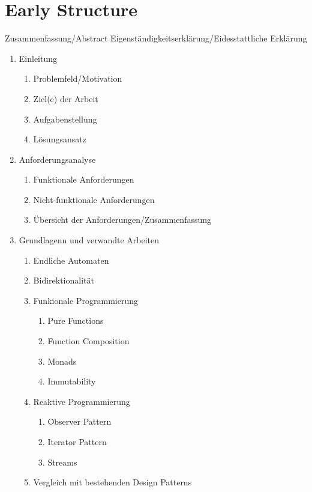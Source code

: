 \section{Early Structure}
\label{sec:early-structure}

\quad Zusammenfassung/Abstract \linebreak
\quad Eigenständigkeitserklärung/Eidesstattliche Erklärung
\begin{enumerate}
    \item Einleitung
    \begin{enumerate}
        \item Problemfeld/Motivation
        \item Ziel(e) der Arbeit
        \item Aufgabenstellung
        \item Lösungsansatz
    \end{enumerate}
    \item Anforderungsanalyse
    \begin{enumerate}
        \item Funktionale Anforderungen
        \item Nicht-funktionale Anforderungen
        \item Übersicht der Anforderungen/Zusammenfassung
    \end{enumerate}
    \item Grundlagenn und verwandte Arbeiten
    \begin{enumerate}
        \item Endliche Automaten
        \item Bidirektionalität
        \item Funkionale Programmierung
        \begin{enumerate}
            \item Pure Functions
            \item Function Composition
            \item Monads
            \item Immutability
        \end{enumerate}
        \item Reaktive Programmierung
        \begin{enumerate}
            \item Observer Pattern
            \item Iterator Pattern
            \item Streams
        \end{enumerate}
        \item Vergleich mit bestehenden Design Patterns

\end{enumerate}
\end{enumerate}
